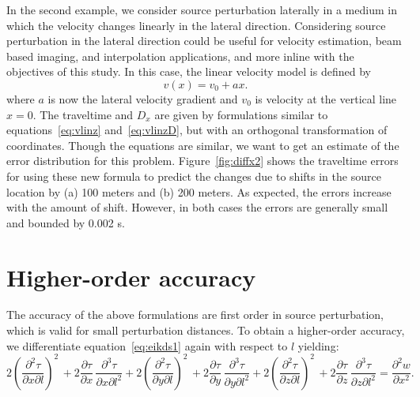In the second example, we consider source perturbation laterally in a
medium in which the velocity changes linearly in the lateral
direction. Considering source perturbation in the lateral direction
could be useful for velocity estimation, beam based imaging, and
interpolation applications, and more inline with the objectives of
this study.  In this case, the linear velocity model is defined by
\begin{equation}
v(x) = v_0 + a x.
\label{eq:vx}
\end{equation}
where $a$ is now the lateral velocity gradient and $v_0$ is velocity
at the vertical line $x=0$.  The traveltime and $D_x$ are given by
formulations similar to equations~\ref{eq:vlinz} and~\ref{eq:vlinzD},
but with an orthogonal transformation of coordinates. Though the
equations are similar, we want to get an estimate of the error
distribution for this problem. Figure~\ref{fig:diffx2} shows the
traveltime errors for using these new formula to predict the changes
due to shifts in the source location by (a) 100 meters and (b) 200
meters. As expected, the errors increase with the amount of
shift. However, in both cases the errors are generally small and
bounded by 0.002 s.



\section{Higher-order accuracy}

The accuracy of the above formulations are first order in source
perturbation, which is valid for small perturbation distances.  To
obtain a higher-order accuracy, we differentiate
equation~\ref{eq:eikds1} again with respect to $l$ yielding:
\begin{equation}
2 \left(\frac{\partial^2 \tau}{\partial x \partial l}\right)^2 \, + 
2 \frac{\partial \tau}{\partial x} \, \frac{\partial^3 \tau}{\partial x \partial l^2} + 
2 \left(\frac{\partial^2 \tau}{\partial y \partial l}\right)^2 \, +
2 \frac{\partial \tau}{\partial y} \, \frac{\partial^3 \tau}{\partial y \partial l^2}+
2 \left(\frac{\partial^2 \tau}{\partial z \partial l}\right)^2 \, +
2 \frac{\partial \tau}{\partial z} \, \frac{\partial^3 \tau}{\partial z \partial l^2} = \frac{\partial^2 w}{\partial x^2}.
\label{eq:eikdsd2}
\end{equation}

